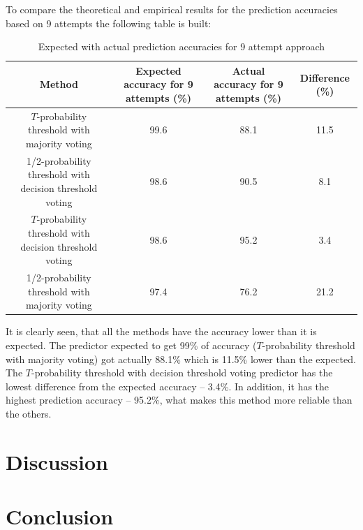 \documentclass[12pt]{article}
\theoremstyle{definition}
\begin{document}
To compare the theoretical and empirical results for the prediction accuracies based on 9 attempts the following table is built:
\begin{table}[H]
\begin{center}
  \begin{tabular}{ | c | c | c | c | }
    \hline
    Method &\parbox[c]{1.8cm}{\raggedright Expected accuracy for 9 attempts (\%)} &\parbox[c]{1.8cm}{\raggedright Actual accuracy for 9 attempts (\%)} &\parbox[c]{1.8cm}{\raggedright Difference (\%)}\\ \hline
    \parbox[c]{7cm}{\raggedright $T$-probability threshold with majority voting} & 99.6 & 88.1 & 11.5 \\ \hline
    \parbox[c]{7cm}{1/2-probability threshold with decision threshold voting} & 98.6 & 90.5 & 8.1 \\ \hline
	\parbox[c]{7cm}{$T$-probability threshold with decision threshold voting} & 98.6 & 95.2 & 3.4\\ \hline
	\parbox[c]{7cm}{1/2-probability threshold with majority voting} & 97.4 & 76.2 & 21.2\\ \hline
  \end{tabular}
\end{center}
\caption{Expected with actual prediction accuracies for 9 attempt approach}
\end{table}

It is clearly seen, that all the methods have the accuracy lower than it is expected. The predictor expected to get 99\% of accuracy ($T$-probability threshold with majority voting) got actually 88.1\% which is 11.5\% lower than the expected. The $T$-probability threshold with decision threshold voting predictor has the lowest difference from the expected accuracy -- 3.4\%. In addition, it has the highest prediction accuracy -- 95.2\%, what makes this method more reliable than the others.
\newpage
\section{Discussion}

\newpage
\section{Conclusion}


\newpage




\newpage
\appendix
\end{document}
